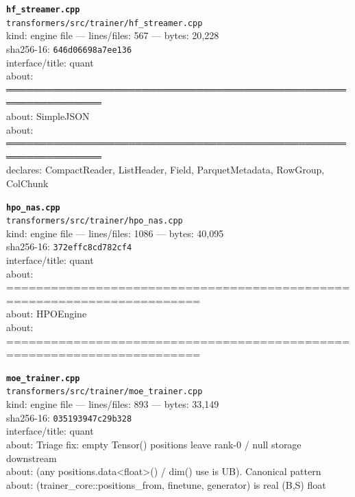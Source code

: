 \noindent\textbf{\texttt{hf\_streamer.cpp}}\\
\texttt{transformers/src/trainer/hf\_streamer.cpp}\\
kind: engine file --- lines/files: 567 --- bytes: 20,228\\
sha256-16: \texttt{646d06698a7ee136}\\
interface/title: quant\\
about: ════════════════════════════════════════════════════════════════\\
about: SimpleJSON\\
about: ════════════════════════════════════════════════════════════════\\
declares: CompactReader, ListHeader, Field, ParquetMetadata, RowGroup, ColChunk\\
\vspace*{6.0pt}
\newpage

\noindent\textbf{\texttt{hpo\_nas.cpp}}\\
\texttt{transformers/src/trainer/hpo\_nas.cpp}\\
kind: engine file --- lines/files: 1086 --- bytes: 40,095\\
sha256-16: \texttt{372effc8cd782cf4}\\
interface/title: quant\\
about: ========================================================================\\
about: HPOEngine\\
about: ========================================================================\\
\vspace*{6.0pt}

\noindent\textbf{\texttt{moe\_trainer.cpp}}\\
\texttt{transformers/src/trainer/moe\_trainer.cpp}\\
kind: engine file --- lines/files: 893 --- bytes: 33,149\\
sha256-16: \texttt{035193947c29b328}\\
interface/title: quant\\
about: Triage fix: empty Tensor() positions leave rank-0 / null storage downstream\\
about: (any positions.data<float>() / dim() use is UB). Canonical pattern\\
about: (trainer\_core::positions\_from, finetune, generator) is real (B,S) float\\
\vspace*{6.0pt}

